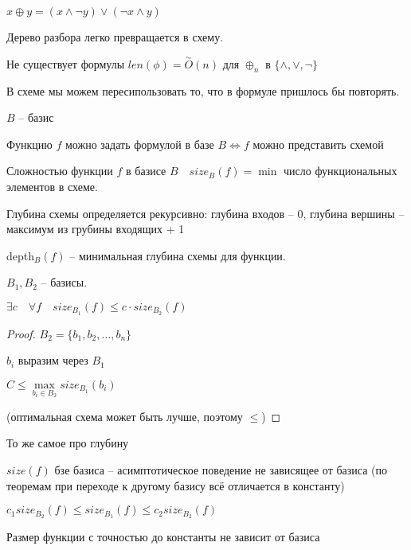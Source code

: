 \documentclass{book}
\theoremstyle{definition}
\begin{document}
$x\oplus y = (x\land \neg y) \lor (\neg x \land y)$

Дерево разбора легко превращается в схему.
\begin{theorem}
    Не существует формулы $len(\phi) = \overset{\sim }O(n)$ для $\oplus_n$ в $\{\land, \lor, \neg\}$
\end{theorem}
В схеме мы можем пересипользовать то, что в формуле пришлось бы повторять.

$B$ -- базис

 \begin{theorem}
     Функцию $f$ можно задать формулой в базе $B \iff  f$ можно представить схемой 
 \end{theorem}

 \begin{definition}
     Сложностью функции $f$ в базисе $B\quad size_B(f) = \min$ число функциональных элементов в схеме.
 \end{definition}
 \begin{definition}
     Глубина схемы определяется рекурсивно: глубина входов -- 0, глубина вершины -- максимум из грубины входящих + 1

     depth$_B(f)$ -- минимальная глубина схемы для функции.
 \end{definition}

 \begin{theorem}
        $B_1, B_2$ -- базисы.

        $\exists c\quad\forall f\quad size_{B_1}(f) \leqslant c\cdot size_{B_2}(f)$
 \end{theorem}
 \begin{proof}
     $B_2 = \{b_1, b_2, \ldots, b_n\}$

     $b_i$ выразим через $B_1$

     $C\leqslant \max\limits_{b_i\in B_2} size_{B_1}(b_i)$

     (оптимальная схема может быть лучше, поэтому $\leqslant $)
 \end{proof}
 \begin{theorem}
     То же самое про глубину
 \end{theorem}
\begin{corollary}
    $size(f)$ бзе базиса -- асимптотическое поведение не зависящее от базиса (по теоремам при переходе к другому базису всё отличается в константу) 
\end{corollary}
\begin{corollary}
    $c_1 size_{B_2}(f) \leqslant size_{B_1}(f) \leqslant  c_2 size_{B_2}(f)$

    Размер функции с точностью до константы не зависит от базиса
\end{corollary}
 
\end{document}

